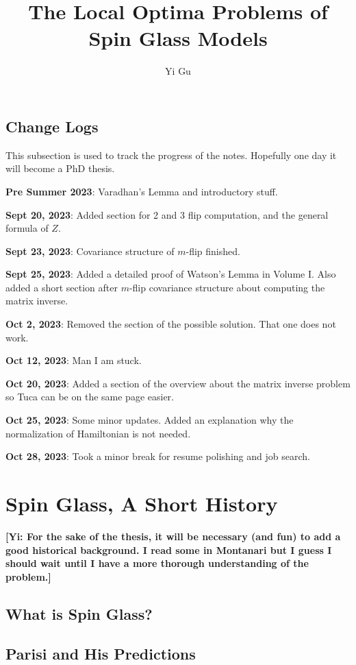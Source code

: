 \documentclass[10pt]{article}
\author{Yi Gu}
\newcommand{\gy}[1]{\textbf{\color{red}[Yi: #1]}}
\newenvironment{Proof of lemma}{\noindent{\bf Proof of Lemma}}{\hfill$\Box$\newline}
\newenvironment{Proof of claim}{\noindent{\bf Proof of claim}}{\hfill$\Box$\newline}
\newenvironment{Proof of theorem}{\noindent{\bf Proof of Theorem}}{\hfill\scriptsize{$\Box$}\newline}
\newenvironment{Proof of theorems}{\noindent{\bf Proof of Theorems}}{\hfill$\Box$\newline}
\newenvironment{Proof of proposition}{\noindent{\bf Proof of Proposition}}{\hfill$\Box$\newline}
\newenvironment{Proof of propositions}{\noindent{\bf Proof of Propositions}}{\hfill$\Box$\newline}
\newenvironment{Proof of exercise}{\noindent{\it Proof of Exercise:}}{\hfill$\Box$}
\numberwithin{equation}{section}
\begin{document}
\title{The Local Optima Problems of Spin Glass Models}
\maketitle

\tableofcontents

\subsection{Change Logs}
This subsection is used to track the progress of the notes. Hopefully one day it will become a PhD thesis.

\textbf{Pre Summer 2023}: Varadhan's Lemma and introductory stuff.

\textbf{Sept 20, 2023}: Added section for 2 and 3 flip computation, and the general formula of $Z$.

\textbf{Sept 23, 2023}: Covariance structure of $m$-flip finished.

\textbf{Sept 25, 2023}: Added a detailed proof of Watson's Lemma in Volume I. Also added a short section after $m$-flip covariance structure about computing the matrix inverse.

\textbf{Oct 2, 2023}: Removed the section of the possible solution. That one does not work.

\textbf{Oct 12, 2023}: Man I am stuck.

\textbf{Oct 20, 2023}: Added a section of the overview about the matrix inverse problem so Tuca can be on the same page easier.

\textbf{Oct 25, 2023}: Some minor updates. Added an explanation why the normalization of Hamiltonian is not needed.

\textbf{Oct 28, 2023}: Took a minor break for resume polishing and job search.

\section{Spin Glass, A Short History}
\gy{For the sake of the thesis, it will be necessary (and fun) to add a good historical background. I read some in Montanari but I guess I should wait until I have a more thorough understanding of the problem.}
\subsection{What is Spin Glass?}
\subsection{Parisi and His Predictions}
\end{document}
